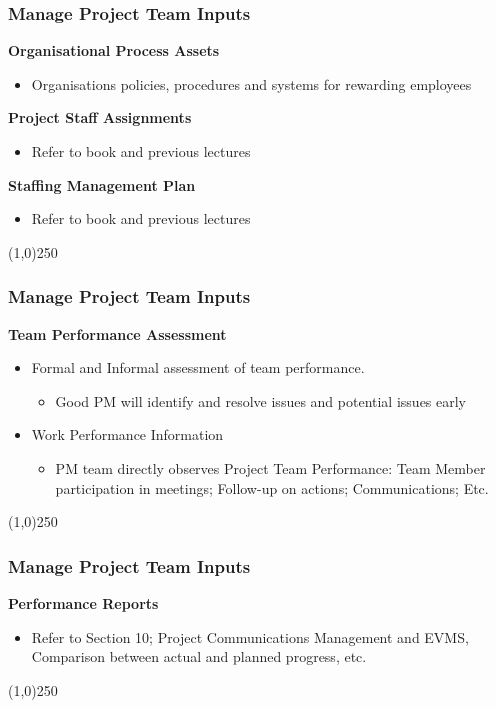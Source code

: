 \begin{frame}
\frametitle{Manage Project Team \hfill Inputs}
\textbf{Organisational Process Assets}
	\begin{itemize}
		\item Organisations policies, procedures and systems for rewarding employees
	\end{itemize}
\textbf{Project Staff Assignments}
	\begin{itemize}
		\item Refer to book and previous lectures
	\end{itemize}
\textbf{Staffing Management Plan}
	\begin{itemize}
		\item Refer to book and previous lectures
	\end{itemize}
\end{frame}\begin{center}\line(1,0){250}\end{center}
 
 
\begin{frame}
\frametitle{Manage Project Team \hfill Inputs}
\textbf{Team Performance Assessment}
\begin{itemize}
	\item Formal and Informal assessment of team performance.
	\begin{itemize}
		\item Good PM will identify and resolve issues and potential issues early
	\end{itemize}
	\item Work Performance Information
	\begin{itemize}
		\item PM team directly observes Project Team Performance: Team Member participation in meetings; Follow-up on actions; Communications; Etc.
	\end{itemize}
\end{itemize}
\end{frame}\begin{center}\line(1,0){250}\end{center}
 
 
\begin{frame}
\frametitle{Manage Project Team \hfill Inputs}
\textbf{Performance Reports}
\begin{itemize}
	\item Refer to Section 10; Project Communications Management and EVMS, Comparison between actual and planned progress, etc.
\end{itemize}
\end{frame}\begin{center}\line(1,0){250}\end{center}


